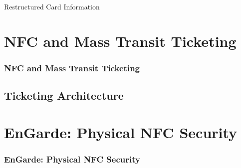 \documentclass[unknownkeysallowed]{beamer}
\begin{document}
\begin{frame}
\begin{minipage}[t][25mm][t]{\textwidth}
{\begin{block}{Restructured Card Information}
        \end{block}
      }
    \end{minipage}
\end{frame}




\section{NFC and Mass Transit Ticketing}
\begin{frame}
\frametitle{NFC and Mass Transit Ticketing}
\begin{center}\begin{minipage}{.9\textwidth}
\tableofcontents[currentsubsection, hideothersubsections, sectionstyle=show/shaded]
\end{minipage}\end{center}
\end{frame}
%

\subsection{Ticketing Architecture}


\section{EnGarde: Physical NFC Security}
\begin{frame}
\frametitle{EnGarde: Physical NFC Security}
\begin{center}\begin{minipage}{.9\textwidth}
\tableofcontents[currentsubsection, hideothersubsections, sectionstyle=show/shaded]
\end{minipage}\end{center}
\end{frame}
%
\end{document}
